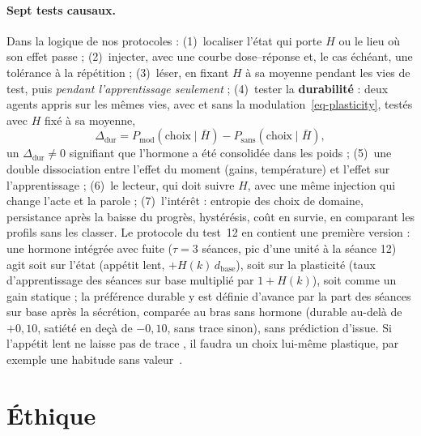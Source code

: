 \documentclass[11pt,a4paper]{article}
\begin{document}
\paragraph{Sept tests causaux.} Dans la logique de nos protocoles : (1)~localiser
l'état qui porte $H$ ou le lieu où son effet passe ; (2)~injecter, avec une courbe
dose--réponse et, le cas échéant, une tolérance à la répétition ; (3)~léser, en
fixant $H$ à sa moyenne pendant les vies de test, puis \emph{pendant l'apprentissage
seulement} ; (4)~tester la \textbf{durabilité} : deux agents appris sur les mêmes vies,
avec et sans la modulation~\eqref{eq-plasticity}, testés avec $H$ fixé à sa moyenne,
\begin{equation}
\Delta_\text{dur}=P_\text{mod}(\text{choix}\mid\bar H)-P_\text{sans}(\text{choix}\mid\bar H),
\label{eq-durable}
\end{equation}
un $\Delta_\text{dur}\ne0$ signifiant que l'hormone a été consolidée dans les poids ;
(5)~une double dissociation entre l'effet du moment (gains, température) et l'effet
sur l'apprentissage ; (6)~le lecteur, qui doit suivre $H$, avec une même injection qui
change l'acte et la parole ; (7)~l'intérêt : entropie des choix de domaine,
persistance après la baisse du progrès, hystérésis, coût en survie, en comparant les
profils sans les classer. Le protocole du test~12 en contient une
première version : une hormone intégrée avec fuite ($\tau=3$ séances, pic d'une unité
à la séance 12) agit soit sur l'état (appétit lent, $+H(k)\,d_\text{base}$), soit sur la
plasticité (taux d'apprentissage des séances sur \og base \fg{} multiplié par
$1+H(k)$), soit comme un gain statique ; la préférence durable y est définie d'avance
par la part des séances sur \og base \fg{} après la sécrétion, comparée au bras sans
hormone (durable au-delà de $+0,10$, satiété en deçà de $-0,10$, sans trace sinon),
sans prédiction d'issue. Si l'appétit lent ne laisse \og pas de trace \fg{}, il
faudra un choix lui-même plastique, par exemple une habitude sans
valeur~\cite{miller2019}.

\section{Éthique}
\label{sec-ethique}
\end{document}
